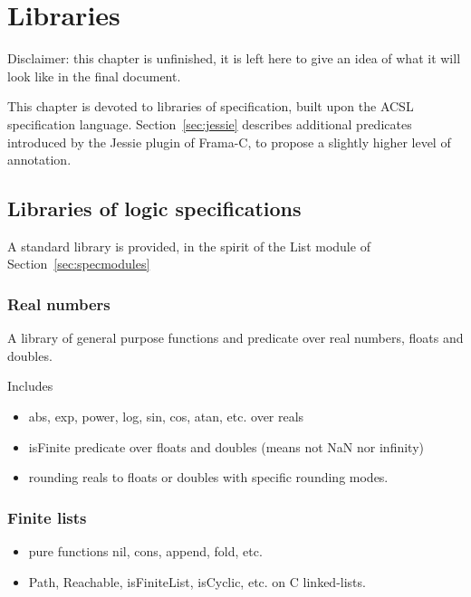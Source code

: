 \chapter{Libraries}
\label{chap:lib}

Disclaimer: this chapter is unfinished, it is left here to give
an idea of what it will look like in the final document.

This chapter is devoted to libraries of specification, built upon the
ACSL specification language.  Section~\ref{sec:jessie} describes
additional predicates introduced by the Jessie plugin of Frama-C, to
propose a slightly higher level of annotation.

\section{Libraries of logic specifications}
\label{sec:speclibraries}

A standard library is provided, in the spirit of the List module of
Section~\ref{sec:specmodules}


\subsection{Real numbers}
\label{sec:libreal}

A library of general purpose functions and predicate over real
numbers, floats and doubles.

Includes

\begin{itemize}
\item abs, exp, power, log, sin, cos, atan, etc. over reals

\item isFinite predicate over floats and doubles (means not NaN nor infinity)

\item rounding reals to floats or doubles with specific rounding modes.

\end{itemize}

\subsection{Finite lists}

\begin{itemize}
\item pure functions nil, cons, append, fold, etc.
\item Path, Reachable, isFiniteList, isCyclic, etc. on C linked-lists.
\end{itemize}


